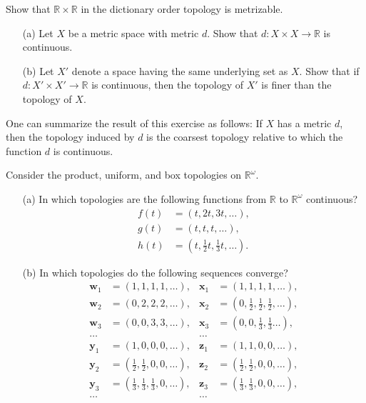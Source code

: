\begin{exercise}[Munkres 20.2]
  Show that $\mathbb{R} \times \mathbb{R}$ in the dictionary order topology is metrizable.
\end{exercise}

\begin{exercise}[Munkres 20.3]
  \begin{enumerate} 
    \item[(a)] Let $X$ be a metric space with metric $d$. Show that $d : X \times X \to \mathbb{R}$ is continuous.
    
    \item[(b)] Let $X'$ denote a space having the same underlying set as $X$. Show that if $d : X' \times X' \to \mathbb{R}$ is continuous, then the topology of $X'$ is finer than the topology of $X$.
  \end{enumerate}
  
  One can summarize the result of this exercise as follows: If $X$ has a metric $d$, then the topology induced by $d$ is the coarsest topology relative to which the function $d$ is continuous.
\end{exercise}

\begin{exercise}[Munkres 20.4]
  Consider the product, uniform, and box topologies on $\mathbb{R}^\omega$.
  \begin{enumerate} 
    \item[(a)] In which topologies are the following functions from $\mathbb{R}$ to $\mathbb{R}^\omega$ continuous?
    \begin{align*}
      f(t) &= (t, 2t, 3t, \ldots), \\
      g(t) &= (t, t, t, \ldots), \\
      h(t) &= (t, \frac{1}{2}t, \frac{1}{3}t, \ldots).
    \end{align*}
    
    \item[(b)] In which topologies do the following sequences converge?
    \begin{align*}
      \mathbf{w}_1 &= (1, 1, 1, 1, \ldots), & \mathbf{x}_1 &= (1, 1, 1, 1, \ldots), \\
      \mathbf{w}_2 &= (0, 2, 2, 2, \ldots), & \mathbf{x}_2 &= (0, \frac{1}{2}, \frac{1}{2}, \frac{1}{2}, \ldots), \\
      \mathbf{w}_3 &= (0, 0, 3, 3, \ldots), & \mathbf{x}_3 &= (0, 0, \frac{1}{3}, \frac{1}{3} \ldots), \\
      \ldots & & \ldots \\
      \mathbf{y}_1 &= (1, 0, 0, 0, \ldots), & \mathbf{z}_1 &= (1, 1, 0, 0, \ldots), \\
      \mathbf{y}_2 &= (\frac{1}{2}, \frac{1}{2}, 0, 0, \ldots), & \mathbf{z}_2 &= (\frac{1}{2}, \frac{1}{2}, 0, 0, \ldots), \\
      \mathbf{y}_3 &= (\frac{1}{3}, \frac{1}{3}, \frac{1}{3}, 0, \ldots), & \mathbf{z}_3 &= (\frac{1}{3}, \frac{1}{3}, 0, 0, \ldots), \\
      \ldots & & \ldots
    \end{align*}
  \end{enumerate}
\end{exercise}

